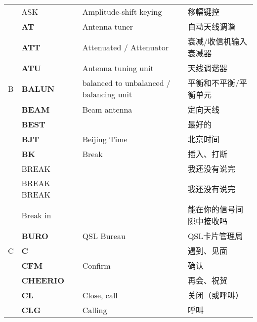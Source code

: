 \begin{longtable}[l]{llll}
    & ASK                               & Amplitude-shift keying                  & 移幅键控                \\
    & \textbf{AT}                       & Antenna tuner                           & 自动天线调谐              \\
    & \textbf{ATT}                      & Attenuated / Attenuator                 & 衰减/收信机输入衰减器         \\
    & \textbf{ATU}                      & Antenna tuning unit                     & 天线调谐器               \\
  B & \textbf{BALUN}                    & balanced to unbalanced / balancing unit & 平衡和不平衡/平衡单元         \\
    & \textbf{BEAM}                     & Beam antenna                            & 定向天线                \\
    & \textbf{BEST}                     &                                         & 最好的                 \\
    & \textbf{BJT}                      & Beijing Time                            & 北京时间                \\
    & \textbf{BK}                       & Break                                   & 插入、打断               \\
    & BREAK                             &                                         & 我还没有说完              \\
    & BREAK BREAK                       &                                         & 我还没有说完              \\
    & Break in                          &                                         & 能在你的信号间隙中接收吗        \\
    & \textbf{BURO}                     & QSL Bureau                              & QSL卡片管理局            \\
  C & \textbf{C}                        &                                         & 遇到、见面               \\
    & \textbf{CFM}                      & Confirm                                 & 确认                  \\
    & \textbf{CHEERIO}                  &                                         & 再会、祝贺               \\
    & \textbf{CL}                       & Close, call                             & 关闭（或呼叫）             \\
    & \textbf{CLG}                      & Calling                                 & 呼叫                  \\

\end{longtable}
